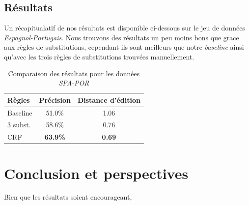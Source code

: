 \documentclass{article}
\begin{document}
\subsection{Résultats}
Un récapitualatif de nos résultats est disponible ci-dessous sur le jeu de données \emph{Espagnol-Portugais}. Nous trouvons des résultats un peu moins bons que grace aux règles de substitutions, cependant ils sont meilleurs que notre \emph{baseline} ainsi qu'avec les trois règles de substitutions trouvées manuellement.

\begin{table}[H]
    \caption{Comparaison des résultats pour les données \emph{SPA-POR}}
\begin{center}
\begin{tabular}{|l|c|c|}
\hline
Règles&Précision&Distance d'édition\\
\hline
Baseline&51.0\%&1.06\\
\hline
3 subst.&58.6\%&0.76\\
\hline
CRF&\textbf{63.9\%}&\textbf{0.69}\\
\hline
\end{tabular}
\end{center}
\end{table}

\section{Conclusion et perspectives}
Bien que les résultats soient encourageant, 



\end{document}
